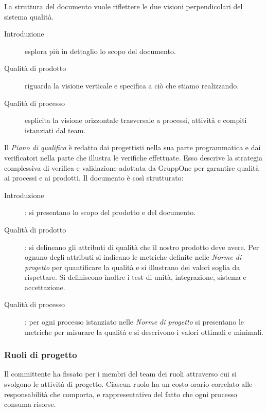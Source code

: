 \documentclass[../norme-di-progetto.tex]{subfiles}
\begin{document}
La struttura del documento vuole riflettere le due visioni perpendicolari del sistema qualità.

\begin{description}
  \item [Introduzione] esplora più in dettaglio lo scopo del documento.
  \item [Qualità di prodotto] riguarda la visione verticale e specifica a ciò che stiamo realizzando.
  \item [Qualità di processo] esplicita la visione orizzontale trasversale a processi, attività e compiti istanziati dal team.
\end{description}

Il \textit{Piano di qualifica} è redatto dai progettisti nella sua parte programmatica e dai verificatori nella parte che illustra le verifiche effettuate. Esso descrive la strategia complessiva di verifica e validazione adottata da GruppOne per garantire qualità ai processi e ai prodotti. Il documento è così strutturato:
\begin{description}
  \item [Introduzione]: si presentano lo scopo del prodotto e del documento.
  \item [Qualità di prodotto]: si delineano gli attributi di qualità che il nostro prodotto deve avere. Per ognuno degli attributi si indicano le metriche definite nelle \textit{Norme di progetto} per quantificare la qualità e si illustrano dei valori soglia da rispettare. Si definiscono inoltre i test di unità, integrazione, sistema e accettazione.
  \item [Qualità di processo]: per ogni processo istanziato nelle \textit{Norme di progetto} si presentano le metriche per misurare la qualità e si descrivono i valori ottimali e minimali.
\end{description}

\subsubsection{Ruoli di progetto}%
\label{subs:ruoli_di_progetto}

Il committente ha fissato per i membri del team dei ruoli attraverso cui si svolgono le attività di progetto. Ciascun ruolo ha un costo orario correlato alle responsabilità che comporta, e rappresentativo del fatto che ogni processo consuma risorse.
\end{document}
